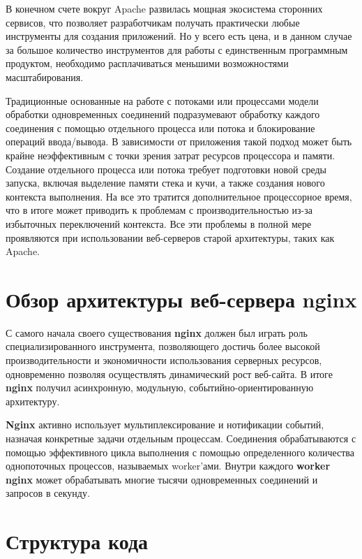 \documentclass[14pt, a4paper]{article}
\begin{document}
В конечном счете вокруг Apache развилась мощная экосистема сторонних сервисов, 
что позволяет разработчикам получать практически любые инструменты для создания приложений. 
Но у всего есть цена, и в данном случае за большое количество инструментов для работы с 
единственным программным продуктом, необходимо расплачиваться меньшими возможностями масштабирования.

Традиционные основанные на работе с потоками или процессами модели обработки одновременных соединений 
подразумевают обработку каждого соединения с помощью отдельного процесса или потока и блокирование 
операций ввода/вывода. В зависимости от приложения такой подход может быть крайне неэффективным с 
точки зрения затрат ресурсов процессора и памяти. Создание отдельного процесса или потока требует 
подготовки новой среды запуска, включая выделение памяти стека и кучи, а также создания нового 
контекста выполнения. На все это тратится дополнительное процессорное время, что в итоге может 
приводить к проблемам с производительностью из-за избыточных переключений контекста. Все эти 
проблемы в полной мере проявляются при использовании веб-серверов старой архитектуры, таких как Apache.

\section*{Обзор архитектуры веб-сервера nginx}
С самого начала своего существования \textbf{nginx} должен был играть роль специализированного инструмента, 
позволяющего достичь более высокой производительности и экономичности использования серверных ресурсов, 
одновременно позволяя осуществлять динамический рост веб-сайта. В итоге \textbf{nginx} получил асинхронную, 
модульную, событийно-ориентированную архитектуру.

\textbf{Nginx} активно использует мультиплексирование и нотификации событий, назначая конкретные задачи 
отдельным процессам. Соединения обрабатываются с помощью эффективного цикла выполнения с помощью 
определенного количества однопоточных процессов, называемых worker’ами. Внутри каждого \textbf{worker} 
\textbf{nginx} может обрабатывать многие тысячи одновременных соединений и запросов в секунду.


\section*{Структура кода}
\end{document}
